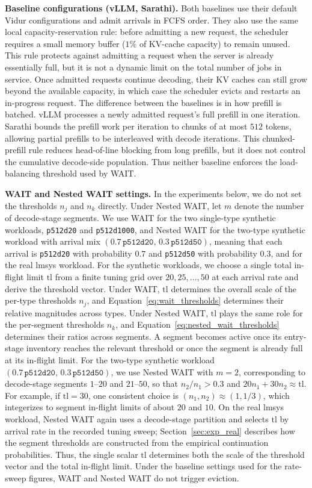 \textbf{Baseline configurations (vLLM, Sarathi).} Both baselines use their default Vidur configurations and admit arrivals in FCFS order. They also use the same local capacity-reservation rule: before admitting a new request, the scheduler requires a small memory buffer ($1\%$ of KV-cache capacity) to remain unused. This rule protects against admitting a request when the server is already essentially full, but it is not a dynamic limit on the total number of jobs in service. Once admitted requests continue decoding, their KV caches can still grow beyond the available capacity, in which case the scheduler evicts and restarts an in-progress request. The difference between the baselines is in how prefill is batched. vLLM processes a newly admitted request's full prefill in one iteration. Sarathi bounds the prefill work per iteration to chunks of at most $512$ tokens, allowing partial prefills to be interleaved with decode iterations. This chunked-prefill rule reduces head-of-line blocking from long prefills, but it does not control the cumulative decode-side population. Thus neither baseline enforces the load-balancing threshold used by WAIT.

\textbf{WAIT and Nested WAIT settings.} In the experiments below, we do not set the thresholds $n_j$ and $n_k$ directly. Under Nested WAIT, let $m$ denote the number of decode-stage segments. We use WAIT for the two single-type synthetic workloads, \texttt{p512d20} and \texttt{p512d1000}, and Nested WAIT for the two-type synthetic workload with arrival mix $(0.7\,\texttt{p512d20},\,0.3\,\texttt{p512d50})$, meaning that each arrival is \texttt{p512d20} with probability $0.7$ and \texttt{p512d50} with probability $0.3$, and for the real lmsys workload. For the synthetic workloads, we choose a single total in-flight limit $\mathrm{tl}$ from a finite tuning grid over $20,25,\ldots,50$ at each arrival rate and derive the threshold vector. Under WAIT, $\mathrm{tl}$ determines the overall scale of the per-type thresholds $n_j$, and Equation~\eqref{eq:wait_thresholds} determines their relative magnitudes across types. Under Nested WAIT, $\mathrm{tl}$ plays the same role for the per-segment thresholds $n_k$, and Equation~\eqref{eq:nested_wait_thresholds} determines their ratios across segments. A segment becomes active once its entry-stage inventory reaches the relevant threshold or once the segment is already full at its in-flight limit. For the two-type synthetic workload $(0.7\,\texttt{p512d20},\,0.3\,\texttt{p512d50})$, we use Nested WAIT with $m=2$, corresponding to decode-stage segments $1$--$20$ and $21$--$50$, so that $n_2/n_1 > 0.3$ and $20n_1 + 30n_2 \approx \mathrm{tl}$. For example, if $\mathrm{tl}=30$, one consistent choice is $(n_1,n_2)\approx(1,1/3)$, which integerizes to segment in-flight limits of about $20$ and $10$. On the real lmsys workload, Nested WAIT again uses a decode-stage partition and selects $\mathrm{tl}$ by arrival rate in the recorded tuning sweep; Section~\ref{sec:exp_real} describes how the segment thresholds are constructed from the empirical continuation probabilities. Thus, the single scalar $\mathrm{tl}$ determines both the scale of the threshold vector and the total in-flight limit. Under the baseline settings used for the rate-sweep figures, WAIT and Nested WAIT do not trigger eviction.



